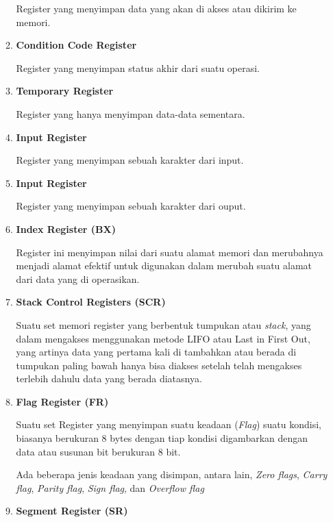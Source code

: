 \begin{enumerate}[label=\alph*.]
\begin{enumerate}[label=\roman*.]
        Register yang menyimpan data yang akan di akses atau dikirim ke memori.

      \item \textbf{Condition Code Register}

        Register yang menyimpan status akhir dari suatu operasi.

      \item \textbf{Temporary Register}

        Register yang hanya menyimpan data-data sementara.

      \item \textbf{Input Register}

        Register yang menyimpan sebuah karakter dari input.

      \item \textbf{Input Register}

        Register yang menyimpan sebuah karakter dari ouput.

      \item \textbf{Index Register (BX)}

        Register ini menyimpan nilai dari suatu alamat memori dan merubahnya
        menjadi alamat efektif untuk digunakan dalam merubah suatu alamat dari
        data yang di operasikan.

      \item \textbf{Stack Control Registers (SCR)}

        Suatu set memori register yang berbentuk tumpukan atau \textit{stack},
        yang dalam mengakses menggunakan metode LIFO atau Last in First Out, yang
        artinya data yang pertama kali di tambahkan atau berada di tumpukan paling
        bawah hanya bisa diakses setelah telah mengakses terlebih dahulu data
        yang berada diatasnya.

      \item \textbf{Flag Register (FR)}

        Suatu set Register yang menyimpan suatu keadaan (\textit{Flag}) suatu kondisi,
        biasanya berukuran 8 bytes dengan tiap kondisi digambarkan dengan data
        atau susunan bit berukuran 8 bit.

        Ada beberapa jenis keadaan yang disimpan, antara lain, \textit{Zero flags},
        \textit{Carry flag}, \textit{Parity flag}, \textit{Sign flag}, dan \textit{Overflow flag}

      \item \textbf{Segment Register (SR)}


\end{enumerate}
\end{enumerate}
